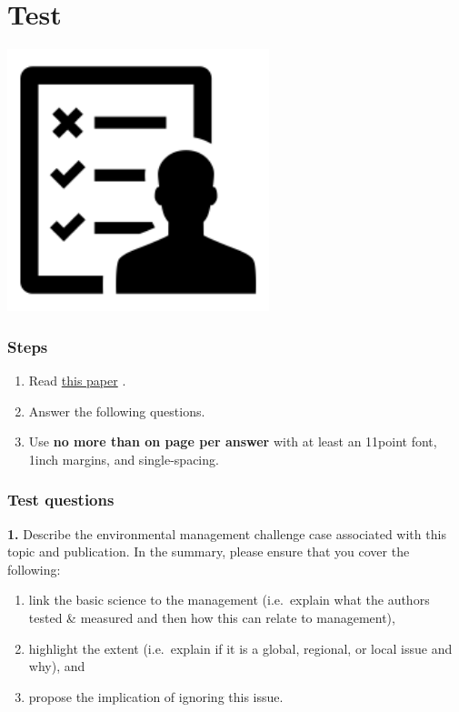 \documentclass[
]{book}
\providecommand{\tightlist}{%
  \setlength{\itemsep}{0pt}\setlength{\parskip}{0pt}}
\begin{document}
\hypertarget{test}{%
\chapter{Test}\label{test}}

\includegraphics[width=3in,height=\textheight]{./test.png}

\hypertarget{steps-1}{%
\subsection*{Steps}\label{steps-1}}

\begin{enumerate}
\def\labelenumi{\arabic{enumi}.}
\tightlist
\item
  Read \href{https://www.facetsjournal.com/doi/full/10.1139/facets-2020-0108}{this paper} \citep{RN7311}.
\item
  Answer the following questions.
\item
  Use \textbf{no more than on page per answer} with at least an 11point font, 1inch margins, and single-spacing.
\end{enumerate}

\hypertarget{test-questions}{%
\subsection*{Test questions}\label{test-questions}}

\textbf{1.} Describe the environmental management challenge case associated with this topic and publication. In the summary, please ensure that you cover the following:

\begin{enumerate}
\def\labelenumi{(\alph{enumi})}
\tightlist
\item
  link the basic science to the management (i.e.~explain what the authors tested \& measured and then how this can relate to management),\\
\item
  highlight the extent (i.e.~explain if it is a global, regional, or local issue and why), and\\
\item
  propose the implication of ignoring this issue.
\end{enumerate}
\end{document}
